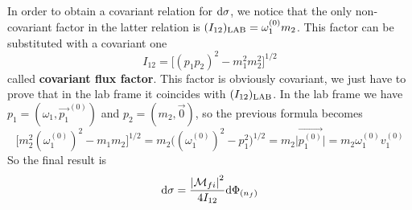 \documentclass[TheoreticalPhy_ModB.tex]{subfiles}
\begin{document}
In order to obtain a covariant relation for $\textup{d} \sigma$, we notice that the only non-covariant factor in the latter relation is $(I_{12})_{\textup{LAB}} = \omega_1^{(0)} m_2$. This factor can be substituted with a covariant one
\[
I_{12} = \bigl[ (p_1 p_2)^2 - m_1^2 m_2^2 \bigr]^{1/2}
\]
called \textbf{covariant flux factor}. This factor is obviously covariant, we just have to prove that in the lab frame it coincides with $(I_{12})_{\textup{LAB}}$.
In the lab frame we have $p_1 = (\omega_1, \vec{p_1}^{(0)})$ and $p_2 = (m_2, \vec{0})$, so the previous formula becomes
\[
\bigl[ m_2^2 (\omega_1^{(0)})^2 - m_1 m_2 \bigr]^{1/2} = m_2 \bigl( (\omega_1^{(0)})^2 - p_1^2 \bigr)^{1/2} = m_2 \big\vert{\vec{p_1^{(0)}}}\big\vert
	= m_2 \omega_1^{(0)} v_1^{(0)}
\]
So the final result is
\[
\textup{d} \sigma = \frac{\abs{\mathcal{M}_{fi}}^2}{4 I_{12}} \textup{d} \Phi_{(n_f)}
\]
\end{document}

